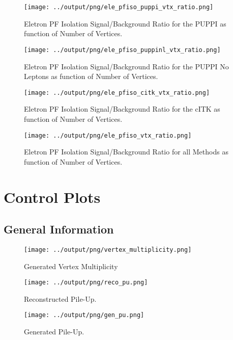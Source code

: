 \documentclass[11pt]{book}
\begin{document}
\begin{figure}[htb]
\centering
\texttt{[image: ../output/png/ele\_pfiso\_puppi\_vtx\_ratio.png]}
\caption{Eletron PF Isolation Signal/Background Ratio for the PUPPI as function of Number of Vertices.}
\label{fig:ele_pfiso_vtx_ratio_puppi}
\end{figure}

\begin{figure}[htb]
\centering
\texttt{[image: ../output/png/ele\_pfiso\_puppinl\_vtx\_ratio.png]}
\caption{Eletron PF Isolation Signal/Background Ratio for the PUPPI No Leptons as function of Number of Vertices.}
\label{fig:ele_pfiso_vtx_ratio_puppinl}
\end{figure}

\begin{figure}[htb]
\centering
\texttt{[image: ../output/png/ele\_pfiso\_citk\_vtx\_ratio.png]}
\caption{Eletron PF Isolation Signal/Background Ratio for the cITK as function of Number of Vertices.}
\label{fig:ele_pfiso_vtx_ratio_citk}
\end{figure}

\begin{figure}[htb]
\centering
\texttt{[image: ../output/png/ele\_pfiso\_vtx\_ratio.png]}
\caption{Eletron PF Isolation Signal/Background Ratio for all Methods as function of Number of Vertices.}
\label{fig:ele_pfiso_vtx_ratio}
\end{figure}
\clearpage

\chapter{Control Plots}
\section{General Information}
\begin{figure}[htb]
\centering
\texttt{[image: ../output/png/vertex\_multiplicity.png]}
\caption{Generated Vertex Multiplicity}
\label{fig:vertex_multiplicity}
\end{figure}

\begin{figure}[htb]
\centering
\texttt{[image: ../output/png/reco\_pu.png]}
\caption{Reconstructed Pile-Up.}
\label{fig:reco_gen_pu}
\end{figure}

\begin{figure}[htb]
\centering
\texttt{[image: ../output/png/gen\_pu.png]}
\caption{Generated Pile-Up.}
\label{fig:reco_gen_pu}
\end{figure}
\end{document}
